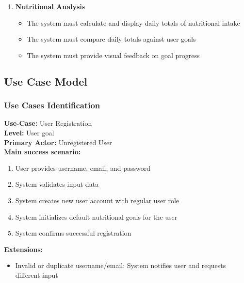 \documentclass[a4paper,10pt]{article}
\begin{document}
\begin{enumerate}
        \item \textbf{Nutritional Analysis}
        \begin{itemize}
            \item The system must calculate and display daily totals of nutritional intake
            \item The system must compare daily totals against user goals
            \item The system must provide visual feedback on goal progress
        \end{itemize}
    \end{enumerate}

    \newpage
    \subsection{Use Case Model}

        \subsubsection{Use Cases Identification}
        \textbf{Use-Case:} User Registration\\
        \textbf{Level:} User goal\\
        \textbf{Primary Actor:} Unregistered User\\
        \textbf{Main success scenario:}
        \begin{enumerate}
            \item User provides username, email, and password
            \item System validates input data
            \item System creates new user account with regular user role
            \item System initializes default nutritional goals for the user
            \item System confirms successful registration
        \end{enumerate}
        \textbf{Extensions:}
        \begin{itemize}
            \item Invalid or duplicate username/email: System notifies user and requests different input
        \end{itemize}
\end{document}
